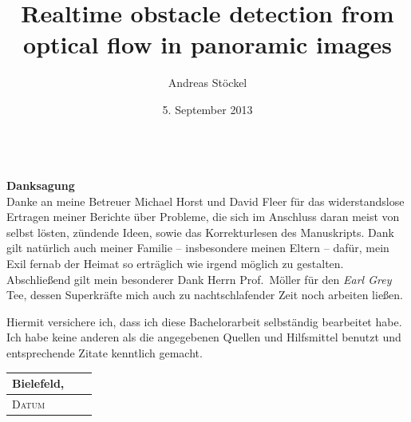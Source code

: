 \documentclass[a4paper,11pt]{memoir}
\title{Realtime obstacle detection from optical flow in panoramic images}
\author{Andreas Stöckel}
\date{5. September 2013}
\makeatletter
\let\insertdate\@date
\let\insertauthor\@author
\makeatother
\begin{document}
\begin{titlingpage}
	\maketitle
	\thispagestyle{empty}
	\clearpage
	\thispagestyle{empty}
	~~\vspace{15.5cm}\\
	\textbf{Danksagung}\vspace{0.75cm}\\
	Danke an meine Betreuer Michael Horst und David Fleer für das widerstandslose Ertragen meiner Berichte über Probleme, die sich im Anschluss daran meist von selbst lösten, zündende Ideen, sowie das Korrekturlesen des Manuskripts. Dank gilt natürlich auch meiner Familie -- insbesondere meinen Eltern -- dafür, mein Exil fernab der Heimat so erträglich wie irgend möglich zu gestalten. Abschließend gilt mein besonderer Dank Herrn Prof.\ Möller für den \textit{Earl Grey} Tee, dessen Superkräfte mich auch zu nachtschlafender Zeit noch arbeiten ließen.
\end{titlingpage}

\setcounter{tocdepth}{2}
\tableofcontents*










\begin{appendix}



\end{appendix}





\cleardoublepage

\pagestyle{empty}

Hiermit versichere ich, dass ich diese Bachelorarbeit selbständig bearbeitet habe. Ich habe keine anderen als die angegebenen Quellen und Hilfsmittel benutzt und entsprechende Zitate kenntlich gemacht.
\begin{center}
\vspace{1.5cm}
\begin{tabular}{l l l}
  Bielefeld, \insertdate & \hspace{0.5cm} & \hspace{6.5cm} \\
  \hline
  \footnotesize \textsc{Datum} & & \footnotesize \textsc{\insertauthor}
\end{tabular}
\end{center}
\end{document}
